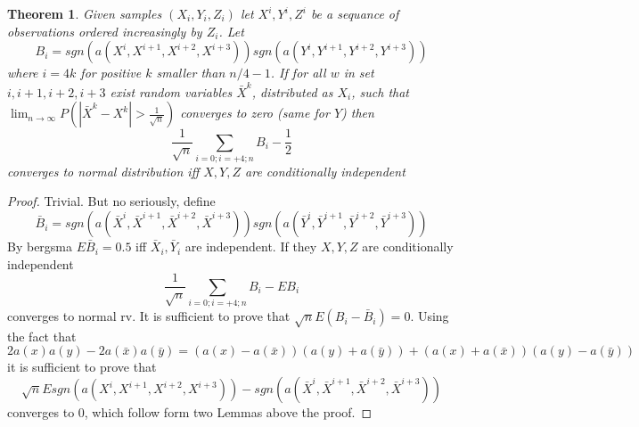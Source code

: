 \documentclass{article}
\newtheorem{Theorem}{Theorem}
\begin{document}
\begin{Theorem}
 Given samples $(X_i,Y_i,Z_i)$ let $X^{i},Y^{i},Z^{i}$ be a sequance of observations ordered increasingly  by $Z_i$. Let
 \[ 
B_i = sgn(a(X^{i},X^{i+1},X^{i+2},X^{i+3})) sgn(a(Y^{i},Y^{i+1},Y^{i+2},Y^{i+3}))  
 \]
where  $i=4k$ for positive $k$ smaller than $n/4-1$. If for all $w$ in set $i,i+1,i+2,i+3$ exist random variables $\bar X^{k}$, distributed as $X_i$, such that  $\lim_{n \to \infty } P(|\bar X^{k} - X^{k}| > \frac{1}{\sqrt n}) $ converges to zero (same for $Y$) then 
\[
 \frac{1}{\sqrt n} \sum_{i=0;i=+4;n} B_i -\frac{1}{2}  
\]
converges to normal distribution iff $X,Y,Z$ are conditionally independent
\end{Theorem}
\begin{proof}
Trivial.  But no seriously, define
\[
 \bar B_i = sgn(a(\bar X^{i},\bar X^{i+1},\bar X^{i+2}, \bar X^{i+3})) sgn(a(\bar Y^{i},\bar Y^{i+1},\bar Y^{i+2},\bar Y^{i+3}))
\]
By bergsma $E \bar B_i = 0.5$ iff $\bar X_i , \bar Y_i$ are independent. If they $X,Y,Z$ are conditionally independent
\[
 \frac{1}{\sqrt n} \sum_{i=0;i=+4;n} B_i -E B_i 
\]
converges to normal rv. It is sufficient to prove that $\sqrt n E (B_i - \bar B_i) =0$.  Using the fact that 
\[
 2a(x)a(y) - 2a(\bar x) a(\bar y) = (a(x) - a(\bar x))(a(y) + a(\bar y)) + (a(x) + a(\bar x))(a(y) - a(\bar y))
\]
it is sufficient to prove that
\[
 \sqrt n E sgn(a(X^{i},X^{i+1},X^{i+2},X^{i+3})) - sgn(a(\bar X^{i},\bar X^{i+1},\bar X^{i+2}, \bar X^{i+3}))
\]
converges to 0, which follow form two Lemmas above the proof.
\end{proof}









\end{document}

